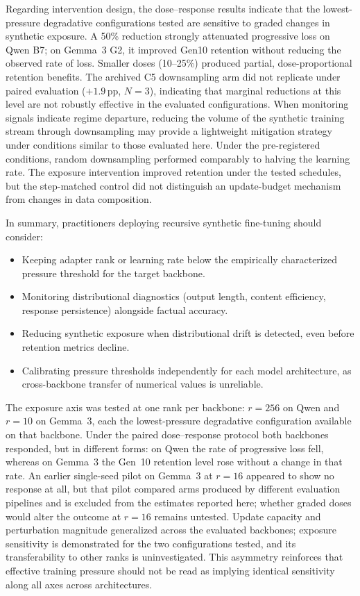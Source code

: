 \documentclass[a4paper,fleqn]{cas-dc}
\newif\ifshowchanges
\newcommand{\rev}[1]{\ifshowchanges{\color{blue}#1}\else{#1}\fi}
\begin{document}
Regarding intervention design, the \rev{dose--response results indicate that the lowest-pressure degradative configurations tested} are sensitive to graded changes in synthetic exposure. \rev{A 50\%
reduction strongly attenuated progressive loss on Qwen B7; on Gemma~3 G2,
it improved Gen10 retention without reducing the observed rate of loss.
Smaller doses (10--25\%) produced partial, dose-proportional retention benefits. The archived C5 downsampling arm did not replicate under paired evaluation ($+1.9$\,pp,
$N=3$), indicating that marginal reductions at this level are not robustly
effective in the evaluated configurations.} When
monitoring signals indicate regime departure, reducing the volume of the
synthetic training stream through downsampling
may provide a lightweight mitigation strategy under conditions
similar to those evaluated here. \rev{Under the pre-registered conditions, random downsampling performed
comparably to halving the learning rate. The exposure intervention improved
retention under the tested schedules, but the step-matched control did not
distinguish an update-budget mechanism from changes in data composition.}

In summary, practitioners deploying recursive synthetic fine-tuning should
consider:
\begin{itemize}
    \item Keeping adapter rank or learning rate below the empirically
    characterized pressure threshold for the target backbone.
    \item Monitoring distributional diagnostics (output length, content
    efficiency, response persistence) alongside factual accuracy.
    \item Reducing synthetic exposure when distributional drift is detected,
    even before retention metrics decline.
    \item Calibrating pressure thresholds independently for each model
    architecture, as cross-backbone transfer of numerical values is unreliable.
\end{itemize}

The exposure axis was tested at one rank per backbone: $r=256$ on Qwen and $r=10$ on Gemma~3, each the lowest-pressure degradative configuration available on that backbone. Under the paired dose--response protocol both backbones responded, but in different forms: on Qwen the rate of progressive loss fell, whereas on Gemma~3 the Gen~10 retention level rose without a change in that rate. An earlier single-seed pilot on Gemma~3 at $r=16$ appeared to show no response at all, but that pilot compared arms produced by different evaluation pipelines and is excluded from the estimates reported here; whether graded doses would alter the outcome at $r=16$ remains untested. Update capacity and perturbation magnitude \rev{generalized across the evaluated backbones}; exposure sensitivity is demonstrated for the two configurations tested, and its transferability to other ranks is uninvestigated. \rev{This asymmetry reinforces that effective training pressure should not be read as implying identical sensitivity along all axes across architectures.}
\end{document}
